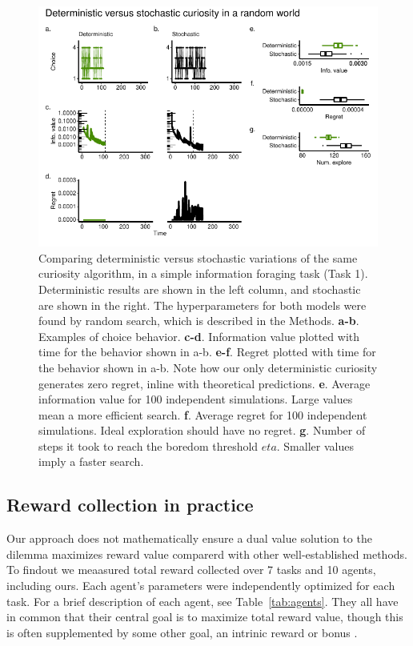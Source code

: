 \begin{figure}
	\begin{fullwidth}
	\includegraphics[width=.7\linewidth]{img/curiosity1.pdf} 
	\caption{Comparing deterministic versus stochastic variations of the same curiosity algorithm, in a simple information foraging task (Task 1). Deterministic results are shown in the left column, and stochastic are shown in the right. The hyperparameters for both models were found by random search, which is described in the Methods.
	\textbf{a-b}. Examples of choice behavior.
	\textbf{c-d}. Information value plotted with time for the behavior shown in a-b.
	\textbf{e-f}. Regret plotted with time for the behavior shown in a-b. Note how our only deterministic curiosity generates zero regret, inline with theoretical predictions.
	\textbf{e}. Average information value for 100 independent simulations. Large values mean a more efficient search.
	\textbf{f}. Average regret for 100 independent simulations. Ideal exploration should have no regret. 
	\textbf{g}. Number of steps it took to reach the boredom threshold $eta$. Smaller values imply a faster search.
	}
	\label{fig:curiosity1} 
	\end{fullwidth}
\end{figure}


\subsection{Reward collection in practice} 
Our approach does not mathematically ensure a dual value solution to the dilemma maximizes reward value comparerd with other well-established methods. To findout we meaasured total reward collected over 7 tasks and 10 agents, including ours. Each agent's parameters were independently optimized for each task. For a brief description of each agent, see Table~\ref{tab:agents}. They all have in common that their central goal is to maximize total reward value, though this is often supplemented by some other goal, an intrinic reward or bonus \cite{Ng1999,Sutton1998}. 

